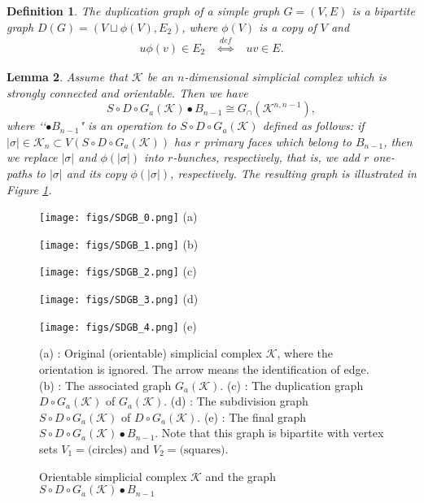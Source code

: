 \documentclass[a4paper,12pt]{article}
\newtheorem{definition}{Definition}[section]
\newtheorem{lemma}[definition]{Lemma}
\numberwithin{equation}{section}
\begin{document}
\begin{definition}\rm
The {\em duplication graph} of a simple graph $G=(V,E)$ is a bipartite graph $D(G)=(V\sqcup \phi(V),E_2)$, where 
$\phi(V)$ is a copy of $V$ and 
\begin{align*}
u\phi(v)\in E_2\quad \stackrel{def}{\Leftrightarrow}\quad uv\in E.
\end{align*}
\end{definition}
%
\begin{lemma}
\label{lem-ori}
Assume that $\mathcal{K}$ be an $n$-dimensional simplicial complex which is strongly connected and orientable. 
Then we have
\begin{equation*}
S\circ D\circ G_{a}(\mathcal{K}) \bullet B_{n-1} \cong G_{\cap}(\mathcal{K}^{n,n-1}),
\end{equation*}
where \lq\lq $\bullet B_{n-1}$" is an operation to $S\circ D\circ G_{a}(\mathcal{K})$ defined as follows: 
if $|\sigma|\in \mathcal{K}_n \subset V(S\circ D\circ G_{a}(\mathcal{K}))$ has $r$ primary faces which belong to $B_{n-1}$, 
then we replace $|\sigma|$ and $\phi(|\sigma|)$ into $r$-bunches, respectively, that is, 
we add $r$ one-paths to $|\sigma|$ and its copy $\phi(|\sigma|)$, respectively. 
The resulting graph is illustrated in Figure \ref{fig-SDGB}.
\end{lemma}
%
%
\begin{figure}[htbp]\em
\begin{minipage}{0.32\hsize}
\centering
\texttt{[image: figs/SDGB\_0.png]}
(a)
\end{minipage}
\begin{minipage}{0.32\hsize}
\centering
\texttt{[image: figs/SDGB\_1.png]}
(b)
\end{minipage}
\begin{minipage}{0.32\hsize}
\centering
\texttt{[image: figs/SDGB\_2.png]}
(c)
\end{minipage}
\begin{minipage}{0.32\hsize}
\centering
\texttt{[image: figs/SDGB\_3.png]}
(d)
\end{minipage}
\begin{minipage}{0.32\hsize}
\centering
\texttt{[image: figs/SDGB\_4.png]}
(e)
\end{minipage}
\caption{Orientable simplicial complex $\mathcal{K}$ and the graph $S\circ D\circ G_{a}(\mathcal{K}) \bullet B_{n-1}$}
\label{fig-SDGB}
(a) : Original (orientable) simplicial complex $\mathcal{K}$, where the orientation is ignored. 
The arrow means the identification of edge.
(b) : The associated graph $G_a(\mathcal{K})$.
(c) : The duplication graph $D\circ G_{a}(\mathcal{K})$ of $G_{a}(\mathcal{K})$.
(d) : The subdivision graph $S\circ D\circ G_{a}(\mathcal{K})$ of $D\circ G_{a}(\mathcal{K})$.
(e) : The final graph $S\circ D\circ G_{a}(\mathcal{K}) \bullet B_{n-1}$.
Note that this graph is bipartite with vertex sets $V_1 = \text{(circles)}$ and $V_2=\text{(squares)}$.
\end{figure}
\end{document}
